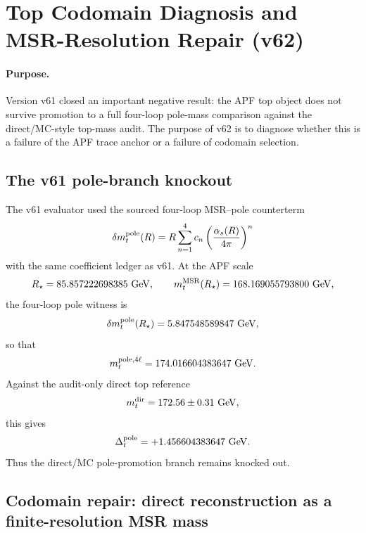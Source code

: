 
\section{Top Codomain Diagnosis and MSR-Resolution Repair (v62)}
\label{sec:top-codomain-diagnosis-msr-repair-v62}

\paragraph{Purpose.}
Version v61 closed an important negative result: the APF top object does not survive promotion to a full four-loop pole-mass comparison against the direct/MC-style top-mass audit.  The purpose of v62 is to diagnose whether this is a failure of the APF trace anchor or a failure of codomain selection.

\begin{center}
\end{center}

\subsection{The v61 pole-branch knockout}

The v61 evaluator used the sourced four-loop MSR--pole counterterm
\[
\delta m_t^{\rm pole}(R)
=R\sum_{n=1}^{4}c_n\left({\alpha_s(R)\over 4\pi}\right)^n
\]
with the same coefficient ledger as v61.  At the APF scale
\[
R_\star=85.857222698385\ {\rm GeV},
\qquad
m_t^{\rm MSR}(R_\star)=168.169055793800\ {\rm GeV},
\]
the four-loop pole witness is
\[
\delta m_t^{\rm pole}(R_\star)=5.847548589847\ {\rm GeV},
\]
so that
\[
 m_t^{\rm pole,4\ell}=174.016604383647\ {\rm GeV}.
\]
Against the audit-only direct top reference
\[
 m_t^{\rm dir}=172.56\pm0.31\ {\rm GeV},
\]
this gives
\[
\Delta_t^{\rm pole}=+1.456604383647\ {\rm GeV}.
\]
Thus the direct/MC pole-promotion branch remains knocked out.

\subsection{Codomain repair: direct reconstruction as a finite-resolution MSR mass}

